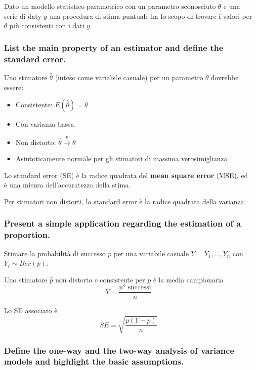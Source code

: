 \documentclass[
]{article}
\begin{document}
Dato un modello statistico parametrico con un parametro sconosciuto
\(\theta\) e una serie di daty \(y\) una procedura di stima puntuale ha
lo scopo di trovare i valori per \(\theta\) più consistenti con i dati
\(y\).

\hypertarget{list-the-main-property-of-an-estimator-and-define-the-standard-error.}{%
\subsubsection{List the main property of an estimator and define the
standard
error.}\label{list-the-main-property-of-an-estimator-and-define-the-standard-error.}}

Uno stimatore \(\hat{\theta}\) (inteso come variabile casuale) per un
parametro \(\theta\) dovrebbe essere:

\begin{itemize}
\item
  Consistente: \(E(\hat{\theta}) = \theta\)
\item
  Con varianza bassa.
\item
  Non distorto: \(\hat{\theta} \xrightarrow{p} \theta\)
\item
  Asintoticamente normale per gli stimatori di massima verosimiglianza
\end{itemize}

Lo standard error (SE) è la radice quadrata del \textbf{mean square
error} (MSE), ed è una misura dell'accuratezza della stima.

Per stimatori non distorti, lo standard error è la radice quadrata della
varianza.

\hypertarget{present-a-simple-application-regarding-the-estimation-of-a-proportion.}{%
\subsubsection{Present a simple application regarding the estimation of
a
proportion.}\label{present-a-simple-application-regarding-the-estimation-of-a-proportion.}}

Stimare la probabilità di successo \(p\) per una variabile casuale
\(Y=Y_1,\dots,Y_n\) con \(Y_i \sim Ber(p)\).

Uno stimatore \(\hat{p}\) non distorto e consistente per \(p\) è la
media campionaria \[ \bar{Y} = \frac{\text{n° successi}}{n}\]

Lo SE associato è \[ SE = \sqrt{\frac{p(1-p)}{n}} \]

\hypertarget{define-the-one-way-and-the-two-way-analysis-of-variance-models-and-highlight-the-basic-assumptions.}{%
\subsubsection{Define the one-way and the two-way analysis of variance
models and highlight the basic
assumptions.}\label{define-the-one-way-and-the-two-way-analysis-of-variance-models-and-highlight-the-basic-assumptions.}}
\end{document}
